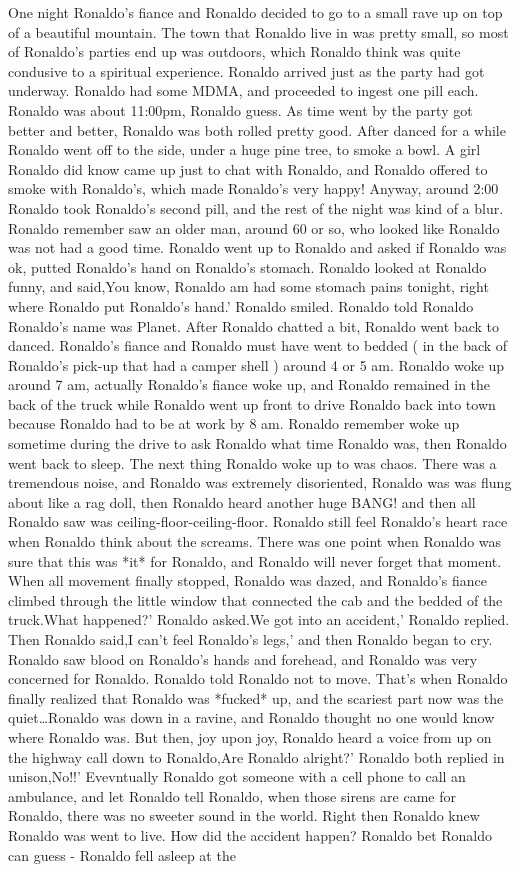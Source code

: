 \documentclass[12pt]{book}
\begin{document}
One night Ronaldo's fiance and Ronaldo decided to go to a small rave up on top of a beautiful mountain. The town that Ronaldo live in was pretty small, so most of Ronaldo's parties end up was outdoors, which Ronaldo think was quite condusive to a spiritual experience. Ronaldo arrived just as the party had got underway. Ronaldo had some MDMA, and proceeded to ingest one pill each. Ronaldo was about 11:00pm, Ronaldo guess. As time went by the party got better and better, Ronaldo was both rolled pretty good. After danced for a while Ronaldo went off to the side, under a huge pine tree, to smoke a bowl. A girl Ronaldo did know came up just to chat with Ronaldo, and Ronaldo offered to smoke with Ronaldo's, which made Ronaldo's very happy! Anyway, around 2:00 Ronaldo took Ronaldo's second pill, and the rest of the night was kind of a blur. Ronaldo remember saw an older man, around 60 or so, who looked like Ronaldo was not had a good time. Ronaldo went up to Ronaldo and asked if Ronaldo was ok, putted Ronaldo's hand on Ronaldo's stomach. Ronaldo looked at Ronaldo funny, and said,You know, Ronaldo am had some stomach pains tonight, right where Ronaldo put Ronaldo's hand.' Ronaldo smiled. Ronaldo told Ronaldo Ronaldo's name was Planet. After Ronaldo chatted a bit, Ronaldo went back to danced. Ronaldo's fiance and Ronaldo must have went to bedded ( in the back of Ronaldo's pick-up that had a camper shell ) around 4 or 5 am. Ronaldo woke up around 7 am, actually Ronaldo's fiance woke up, and Ronaldo remained in the back of the truck while Ronaldo went up front to drive Ronaldo back into town because Ronaldo had to be at work by 8 am. Ronaldo remember woke up sometime during the drive to ask Ronaldo what time Ronaldo was, then Ronaldo went back to sleep. The next thing Ronaldo woke up to was chaos. There was a tremendous noise, and Ronaldo was extremely disoriented, Ronaldo was was flung about like a rag doll, then Ronaldo heard another huge BANG! and then all Ronaldo saw was ceiling-floor-ceiling-floor. Ronaldo still feel Ronaldo's heart race when Ronaldo think about the screams. There was one point when Ronaldo was sure that this was *it* for Ronaldo, and Ronaldo will never forget that moment. When all movement finally stopped, Ronaldo was dazed, and Ronaldo's fiance climbed through the little window that connected the cab and the bedded of the truck.What happened?' Ronaldo asked.We got into an accident,' Ronaldo replied. Then Ronaldo said,I can't feel Ronaldo's legs,' and then Ronaldo began to cry. Ronaldo saw blood on Ronaldo's hands and forehead, and Ronaldo was very concerned for Ronaldo. Ronaldo told Ronaldo not to move. That's when Ronaldo finally realized that Ronaldo was *fucked* up, and the scariest part now was the quiet\ldots Ronaldo was down in a ravine, and Ronaldo thought no one would know where Ronaldo was. But then, joy upon joy, Ronaldo heard a voice from up on the highway call down to Ronaldo,Are Ronaldo alright?' Ronaldo both replied in unison,No!!' Evevntually Ronaldo got someone with a cell phone to call an ambulance, and let Ronaldo tell Ronaldo, when those sirens are came for Ronaldo, there was no sweeter sound in the world. Right then Ronaldo knew Ronaldo was went to live. How did the accident happen? Ronaldo bet Ronaldo can guess - Ronaldo fell asleep at the 
\end{document}
